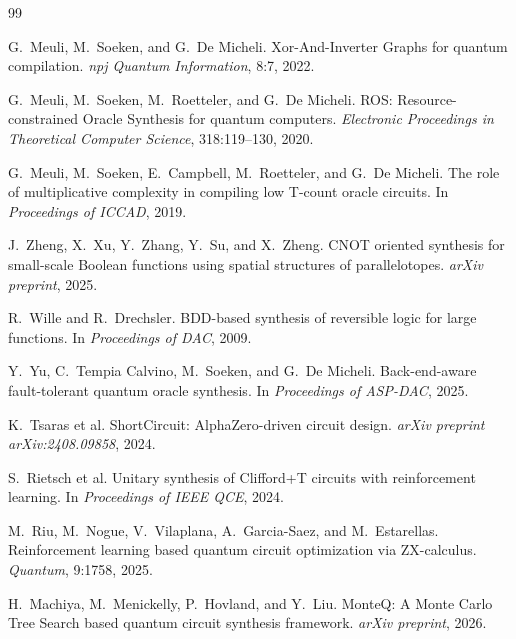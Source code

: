 \documentclass[UTF8,fontset=macnew,11pt]{ctexart}
\begin{document}
\begin{thebibliography}{99}

G.~Meuli, M.~Soeken, and G.~De Micheli.
\newblock Xor-And-Inverter Graphs for quantum compilation.
\newblock \emph{npj Quantum Information}, 8:7, 2022.

G.~Meuli, M.~Soeken, M.~Roetteler, and G.~De Micheli.
\newblock ROS: Resource-constrained Oracle Synthesis for quantum computers.
\newblock \emph{Electronic Proceedings in Theoretical Computer Science}, 318:119--130, 2020.

G.~Meuli, M.~Soeken, E.~Campbell, M.~Roetteler, and G.~De Micheli.
\newblock The role of multiplicative complexity in compiling low T-count oracle circuits.
\newblock In \emph{Proceedings of ICCAD}, 2019.

J.~Zheng, X.~Xu, Y.~Zhang, Y.~Su, and X.~Zheng.
\newblock CNOT oriented synthesis for small-scale Boolean functions using spatial structures of parallelotopes.
\newblock \emph{arXiv preprint}, 2025.

R.~Wille and R.~Drechsler.
\newblock BDD-based synthesis of reversible logic for large functions.
\newblock In \emph{Proceedings of DAC}, 2009.

Y.~Yu, C.~Tempia Calvino, M.~Soeken, and G.~De Micheli.
\newblock Back-end-aware fault-tolerant quantum oracle synthesis.
\newblock In \emph{Proceedings of ASP-DAC}, 2025.

K.~Tsaras et al.
\newblock ShortCircuit: AlphaZero-driven circuit design.
\newblock \emph{arXiv preprint arXiv:2408.09858}, 2024.

S.~Rietsch et al.
\newblock Unitary synthesis of Clifford+T circuits with reinforcement learning.
\newblock In \emph{Proceedings of IEEE QCE}, 2024.

M.~Riu, M.~Nogue, V.~Vilaplana, A.~Garcia-Saez, and M.~Estarellas.
\newblock Reinforcement learning based quantum circuit optimization via ZX-calculus.
\newblock \emph{Quantum}, 9:1758, 2025.

H.~Machiya, M.~Menickelly, P.~Hovland, and Y.~Liu.
\newblock MonteQ: A Monte Carlo Tree Search based quantum circuit synthesis framework.
\newblock \emph{arXiv preprint}, 2026.

\end{thebibliography}
\end{document}
